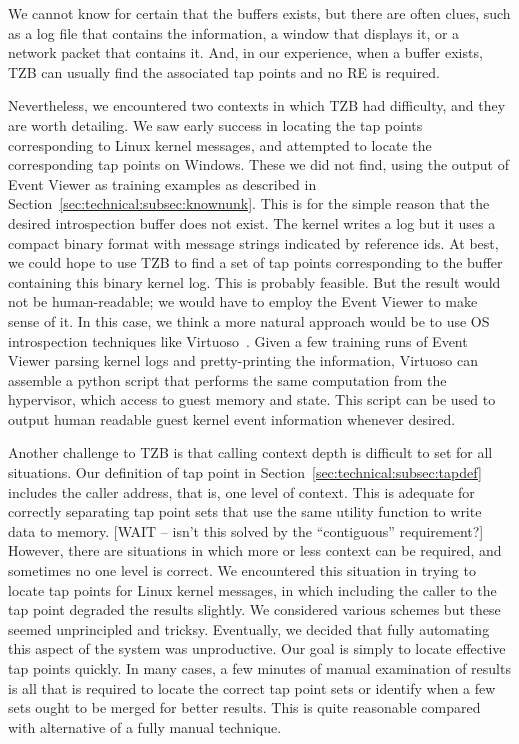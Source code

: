 We cannot know for certain that the buffers exists, but there are often clues, such as a log file that contains the information, a window that displays it, or a network packet that contains it. 
And, in our experience, when a buffer exists, TZB can usually find the associated tap points and no RE is required.  

Nevertheless, we encountered two contexts in which TZB had difficulty, and they are worth detailing.  
We saw early success in locating the tap points corresponding to Linux kernel messages, and attempted to locate the corresponding tap points on Windows.
These we did not find, using the output of Event Viewer as training examples as described in Section~\ref{sec:technical:subsec:knownunk}.
This is for the simple reason that the desired introspection buffer does not exist.
The kernel writes a log but it uses a compact binary format with message strings indicated by reference ids.
At best, we could hope to use TZB to find a set of tap points corresponding to the buffer containing this binary kernel log.
This is probably feasible. 
But the result would not be human-readable; we would have to employ the Event Viewer to make sense of it.
In this case, we think a more natural approach would be to use OS introspection techniques like Virtuoso~\cite{Dolan-Gavitt:2011uq}.
Given a few training runs of Event Viewer parsing kernel logs and pretty-printing the information, Virtuoso can assemble a python script that performs the same computation from the hypervisor, which access to guest memory and state.
This script can be used to output human readable guest kernel event information whenever desired.

Another challenge to TZB is that calling context depth is difficult to set for all situations.  
Our definition of tap point in Section~\ref{sec:technical:subsec:tapdef} includes the caller address, that is, one level of context.
This is adequate for correctly separating tap point sets that use the same utility function to write data to memory. 
[WAIT -- isn't this solved by the ``contiguous'' requirement?]
However, there are situations in which more or less context can be required, and sometimes no one level is correct.  
We encountered this situation in trying to locate tap points for Linux kernel messages, in which including the caller to the tap point degraded the results slightly.
We considered various schemes but these seemed unprincipled and tricksy.  
Eventually, we decided that fully automating this aspect of the system was unproductive.
Our goal is simply to locate effective tap points quickly.
In many cases, a few minutes of manual examination of results is all that is required to locate the correct tap point sets or identify when a few sets ought to be merged for better results. 
This is quite reasonable compared with alternative of a fully manual technique.
